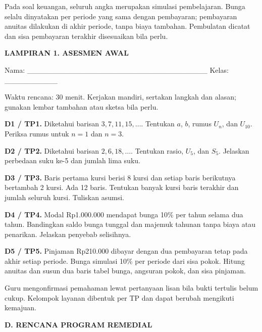 \documentclass[11pt,a4paper]{article}
\begin{document}
{\small Pada soal keuangan, seluruh angka merupakan simulasi pembelajaran. Bunga selalu dinyatakan per periode yang sama dengan pembayaran; pembayaran anuitas dilakukan di akhir periode, tanpa biaya tambahan. Pembulatan dicatat dan sisa pembayaran terakhir disesuaikan bila perlu.\par}\medskip
\clearpage
\begin{center}\bfseries\large LAMPIRAN 1. ASESMEN AWAL\end{center}\medskip
{\small Nama: \_\_\_\_\_\_\_\_\_\_\_\_\_\_\_\_\_\_\_\_\_\_\_\_\_\_\_\_\_\_\_\_\_\_  Kelas: \_\_\_\_\_\_\_\_\_\_\par}\medskip
{\small Waktu rencana: 30 menit. Kerjakan mandiri, sertakan langkah dan alasan; gunakan lembar tambahan atau sketsa bila perlu.\par}\medskip
\noindent\textbf{D1 / TP1.} Diketahui barisan \(3,7,11,15,\ldots\). Tentukan \(a\), \(b\), rumus \(U_n\), dan \(U_{10}\). Periksa rumus untuk \(n=1\) dan \(n=3\).\par\vspace{10mm}
\noindent\textbf{D2 / TP2.} Diketahui barisan \(2,6,18,\ldots\). Tentukan rasio, \(U_5\), dan \(S_5\). Jelaskan perbedaan suku ke-5 dan jumlah lima suku.\par\vspace{10mm}
\noindent\textbf{D3 / TP3.} Baris pertama kursi berisi 8 kursi dan setiap baris berikutnya bertambah 2 kursi. Ada 12 baris. Tentukan banyak kursi baris terakhir dan jumlah seluruh kursi. Tuliskan asumsi.\par\vspace{10mm}
\noindent\textbf{D4 / TP4.} Modal Rp1.000.000 mendapat bunga 10\% per tahun selama dua tahun. Bandingkan saldo bunga tunggal dan majemuk tahunan tanpa biaya atau penarikan. Jelaskan penyebab selisihnya.\par\vspace{10mm}
\noindent\textbf{D5 / TP5.} Pinjaman Rp210.000 dibayar dengan dua pembayaran tetap pada akhir setiap periode. Bunga simulasi 10\% per periode dari sisa pokok. Hitung anuitas dan susun dua baris tabel bunga, angsuran pokok, dan sisa pinjaman.\par\vspace{10mm}
{\small Guru mengonfirmasi pemahaman lewat pertanyaan lisan bila bukti tertulis belum cukup. Kelompok layanan dibentuk per TP dan dapat berubah mengikuti kemajuan.\par}\medskip
\clearpage
\begin{center}\bfseries\large D. RENCANA PROGRAM REMEDIAL\end{center}\medskip
\end{document}

